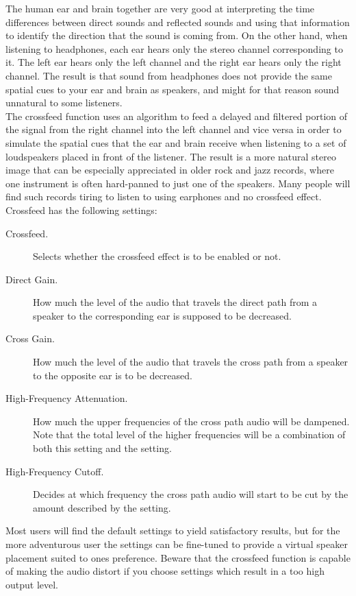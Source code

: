   The human ear and brain together are very good at interpreting the time
  differences between direct sounds and reflected sounds and using that
  information to identify the direction that the sound is coming from. On the
  other hand, when listening to headphones, each ear hears only the stereo
  channel corresponding to it. The left ear hears only the left channel and
  the right ear hears only the right channel. The result is that sound from
  headphones does not provide the same spatial cues to your ear and brain as
  speakers, and might for that reason sound unnatural to some listeners.\\

  The crossfeed function uses an algorithm to feed a delayed and filtered
  portion of the signal from the right channel into the left channel and vice
  versa in order to simulate the spatial cues that the ear and brain receive
  when listening to a set of loudspeakers placed in front of the listener. The
  result is a more natural stereo image that can be especially appreciated in
  older rock and jazz records, where one instrument is often hard-panned to
  just one of the speakers. Many people will find such records tiring to listen
  to using earphones and no crossfeed effect.\\

  Crossfeed has the following settings:
  \begin{description}
  \item[Crossfeed.]
    Selects whether the crossfeed effect is to be enabled or not.
  \item[Direct Gain.]
    How much the level of the audio that travels the direct path from a speaker
    to the corresponding ear is supposed to be decreased.
  \item[Cross Gain.]
    How much the level of the audio that travels the cross path from a speaker
    to the opposite ear is to be decreased.
  \item[High-Frequency Attenuation.]
    How much the upper frequencies of the cross path audio will be dampened.
    Note that the total level of the higher frequencies will be a combination
    of both this setting and the  setting.
  \item[High-Frequency Cutoff.]
    Decides at which frequency the cross path audio will start to be cut
    by the amount described by the 
    setting.
  \end{description}

  Most users will find the default settings to yield satisfactory results, but
  for the more adventurous user the settings can be fine-tuned to provide a
  virtual speaker placement suited to ones preference.
  Beware that the crossfeed function is capable of making the audio distort
  if you choose settings which result in a too high output level.

